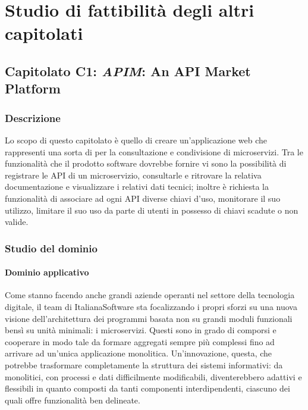 
\section{Studio di fattibilità degli altri capitolati}
	\subsection{Capitolato C1: \emph{APIM}: An API Market Platform}
		\subsubsection{Descrizione}
		Lo scopo di questo capitolato è quello di creare un'applicazione web che rappresenti una sorta di  per la consultazione e 
		condivisione di microservizi. Tra le funzionalità che il prodotto software dovrebbe fornire vi sono la possibilità di registrare le API 
		di un microservizio, consultarle e ritrovare la relativa documentazione e visualizzare i relativi dati tecnici; inoltre è richiesta la 
		funzionalità di associare ad ogni API diverse chiavi d'uso, monitorare il suo utilizzo, limitare il suo uso da parte di utenti in possesso 
		di chiavi scadute o non valide.
		\subsubsection{Studio del dominio}
			\paragraph{Dominio applicativo}
			Come stanno facendo anche grandi aziende operanti nel settore della tecnologia digitale, il team di ItalianaSoftware sta focalizzando i propri sforzi su una nuova visione dell'architettura dei programmi basata non su grandi moduli funzionali bensì su unità minimali: i microservizi. Questi sono in grado di comporsi e cooperare in modo tale da formare aggregati sempre più complessi fino ad arrivare ad un'unica applicazione monolitica. Un'innovazione, questa, che potrebbe trasformare completamente la struttura dei sistemi informativi: da monolitici, con processi e dati difficilmente modificabili, diventerebbero adattivi e flessibili in quanto composti da tanti componenti interdipendenti, ciascuno dei quali offre funzionalità ben delineate.
